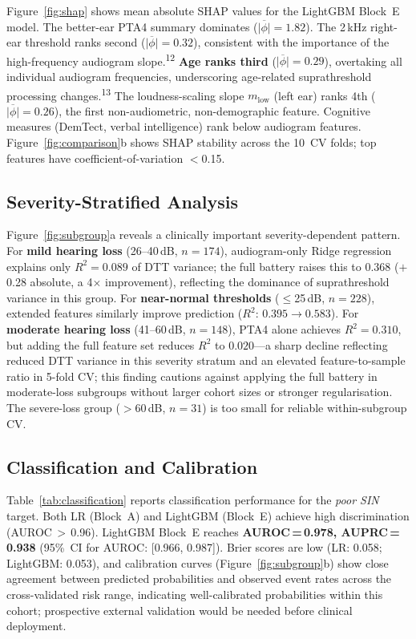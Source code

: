 \documentclass[12pt,a4paper]{article}
\begin{document}
Figure~\ref{fig:shap} shows mean absolute SHAP values for the LightGBM
Block~E model.  The better-ear PTA4 summary dominates
($\overline{|\phi|}{=}1.82$).  The 2\,kHz right-ear threshold ranks second
($\overline{|\phi|}{=}0.32$), consistent with the importance of the
high-frequency audiogram slope.\textsuperscript{12}  \textbf{Age ranks third}
($\overline{|\phi|}{=}0.29$), overtaking all individual audiogram frequencies,
underscoring age-related suprathreshold processing
changes.\textsuperscript{13}  The loudness-scaling slope $m_\text{low}$ (left
ear) ranks 4th ($\overline{|\phi|}{=}0.26$), the first non-audiometric,
non-demographic feature.  Cognitive measures (DemTect, verbal intelligence)
rank below audiogram features.  Figure~\ref{fig:comparison}b shows SHAP
stability across the 10~CV folds; top features have coefficient-of-variation
$<$0.15.

\subsection{Severity-Stratified Analysis}

Figure~\ref{fig:subgroup}a reveals a clinically important severity-dependent
pattern.  For \textbf{mild hearing loss} (26--40\,dB, $n{=}174$),
audiogram-only Ridge regression explains only $R^2{=}0.089$ of DTT variance;
the full battery raises this to $0.368$ ($+$0.28 absolute, a 4$\times$
improvement), reflecting the dominance of suprathreshold variance in this
group.  For \textbf{near-normal thresholds} ($\leq$25\,dB, $n{=}228$),
extended features similarly improve prediction ($R^2$: $0.395\to0.583$).
For \textbf{moderate hearing loss} (41--60\,dB, $n{=}148$), PTA4 alone
achieves $R^2{=}0.310$, but adding the full feature set reduces $R^2$ to
$0.020$---a sharp decline reflecting reduced DTT variance in this severity
stratum and an elevated feature-to-sample ratio in 5-fold CV; this finding
cautions against applying the full battery in moderate-loss subgroups without
larger cohort sizes or stronger regularisation.  The severe-loss group
($>$60\,dB, $n{=}31$) is too small for reliable within-subgroup CV.

\subsection{Classification and Calibration}

Table~\ref{tab:classification} reports classification performance for the
\textit{poor SIN} target.  Both LR (Block~A) and LightGBM (Block~E) achieve
high discrimination (AUROC\,$>$\,0.96).  LightGBM Block~E reaches
\textbf{AUROC\,=\,0.978, AUPRC\,=\,0.938} (95\%~CI for AUROC: [0.966, 0.987]).
Brier scores are low (LR: 0.058; LightGBM: 0.053), and calibration curves
(Figure~\ref{fig:subgroup}b) show close agreement between predicted
probabilities and observed event rates across the cross-validated risk range,
indicating well-calibrated probabilities within this cohort; prospective
external validation would be needed before clinical deployment.
\end{document}
